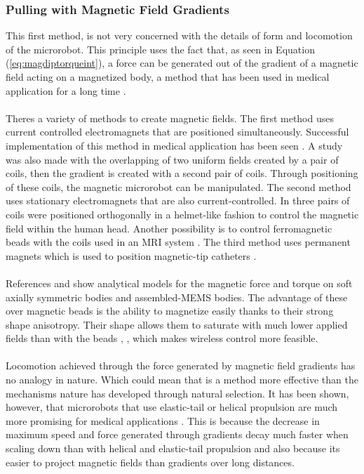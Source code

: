 \subsubsection{Pulling with Magnetic Field Gradients}
This first method, is not very concerned with the details of form and locomotion of the microrobot. This principle uses the fact that, as seen in Equation (\ref{eq:magdiptorqueint}), a force can be generated out of the gradient of a magnetic field acting on a magnetized body, a method that has been used in medical application for a long time \cite{Gillies1994}. \\\\
Theres a variety of methods to create magnetic fields. The first method uses current controlled electromagnets that are positioned simultaneously. Successful implementation of this method in medical application has been seen \cite{Grady1990}.  A study \cite{Yesin2006} was also made with the overlapping of two uniform fields created by a pair of coils, then the gradient is created with a second pair of coils. Through positioning of these coils, the magnetic microrobot can be manipulated. The second method uses stationary electromagnets that are also current-controlled. In \cite{Meeker1996} three pairs of coils were positioned orthogonally in a helmet-like fashion to control the magnetic field within the human head. Another possibility is to control ferromagnetic beads with the coils used in an MRI system \cite{Mathieu2006}. The third method uses permanent magnets which is used to position magnetic-tip catheters \cite{Stereotaxis2008}. \\\\
References \cite{Nagy2008} and \cite{Abbott2007c} show analytical models for the magnetic force and torque on soft axially symmetric bodies and assembled-MEMS bodies. The advantage of these over magnetic beads is the ability to magnetize easily thanks to their strong shape anisotropy. Their shape allows them to saturate with much lower applied fields than with the beads \cite{Nagy2008}, \cite{Yesin2006}, which makes wireless control more feasible. \\\\
Locomotion achieved through the force generated by magnetic field gradients has no analogy in nature. Which could mean that is a method more effective than the mechanisms nature has developed through natural selection. It has been shown, however, that microrobots that use elastic-tail or helical propulsion are much more promising for medical applications \cite{Abbott2010}. This is because the decrease in maximum speed and force generated through gradients decay much faster when scaling down than with helical and elastic-tail propulsion and also because its easier to project magnetic fields than gradients over long distances. 

